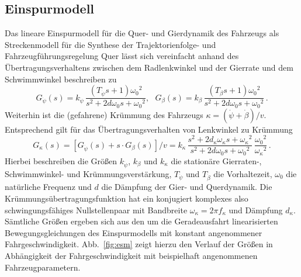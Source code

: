 \subsection{Einspurmodell}
Das lineare Einspurmodell für die Quer- und Gierdynamik des Fahrzeugs als Streckenmodell für die Synthese der Trajektorienfolge- und Fahrzeugführungsregelung Quer lässt sich vereinfacht anhand des Übertragungsverhaltens zwischen dem Radlenkwinkel und der Gierrate und dem Schwimmwinkel beschreiben zu 
\begin{equation}
  G_{\dot{\psi}}(s) = k_{\dot{\psi}}\,{\scriptstyle \frac{(T_{\dot{\psi}}  s +1){\omega_0}^2}{s^2+2  d  \omega_0  s +{\omega_0}^2}},\,\,\,\,
%
  G_{\beta}(s) =  k_{\beta}\,{\scriptstyle \frac{(T_{\beta}  s +1){\omega_0}^2}{s^2+2  d  \omega_0  s +{\omega_0}^2}}\,.
 \label{eq:GpsiP}
\end{equation}
Weiterhin ist die (gefahrene) Krümmung des Fahrzeugs $\kappa=(\dot{\psi}+\dot{\beta})/v$. Entsprechend gilt für das Übertragungsverhalten von Lenkwinkel zu Krümmung 
\begin{equation}
  G_{\kappa}(s) = {\displaystyle [G_{\dot{\psi}}(s)+s \cdot G_{\beta}(s)]/v = k_{\kappa}}\,{\scriptstyle \frac{s^2+2  d_{\kappa}  \omega_{\kappa}  s +{\omega_{\kappa}}^2}{s^2+2  d  \omega_0  s +{\omega_0}^2}\, \frac{{\omega_0}^2}{{\omega_{\kappa}}^2}}\,. 
 \label{eq:Gkappa}
\end{equation}
Hierbei beschreiben die Größen $k_{\dot{\psi}}$, $k_{\beta}$ und $k_\kappa$ die stationäre Gierraten-, Schwimmwinkel- und Krümmungsverstärkung, $T_{\dot{\psi}}$ und $T_{\dot{\beta}}$ die Vorhaltezeit, $\omega_0$ die natürliche Frequenz und $d$ die Dämpfung der Gier- und Querdynamik.
Die Krümmungsübertragungsfunktion hat ein konjugiert komplexes also schwingungsfähiges Nullstellenpaar mit Bandbreite $\omega_\kappa=2 \pi f_\kappa$ und Dämpfung $d_\kappa$.  
Sämtliche Größen ergeben sich aus den um die Geradeausfahrt linearisierten Bewegungsgleichungen des Einspurmodells mit konstant angenommener Fahrgeschwindigkeit. Abb.~\ref{fig:esm} zeigt hierzu den Verlauf der Größen in Abhängigkeit der Fahrgeschwindigkeit mit beispielhaft angenommenen Fahrzeugparametern.
